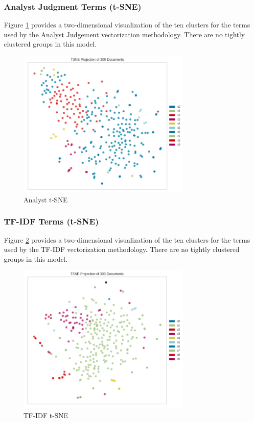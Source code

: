 \documentclass[5p,authoryear]{elsarticle}
\begin{document}
\subsubsection{Analyst Judgment Terms (t-SNE)}\label{judge3}

Figure \ref{Analyst t-SNE2} provides a two-dimensional visualization of the ten clusters for the terms used by the Analyst Judgement vectorization methodology.
There are no tightly clustered groups in this model.

\begin{figure}[!htb] \centering
	\includegraphics[width=3.4in]{figures/term_analyst_tsne.png}
	\caption[]{Analyst t-SNE} 
	\label{Analyst t-SNE2} 
\end{figure}

\subsubsection{TF-IDF Terms (t-SNE)}\label{tfidf3}

Figure \ref{TF-IDF t-SNE2} provides a two-dimensional visualization of the ten clusters for the terms used by the TF-IDF vectorization methodology.
There are no tightly clustered groups in this model.


\begin{figure}[!htb] \centering
	\includegraphics[width=3.4in]{figures/term_tfidf_tsne.png}
	\caption[]{TF-IDF t-SNE} 
	\label{TF-IDF t-SNE2} 
\end{figure}
\end{document}
